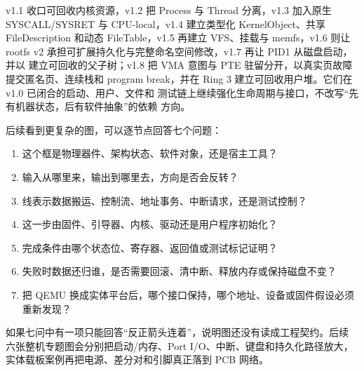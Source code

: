 %
v1.1 收口可回收内核资源，v1.2 把 Process 与 Thread 分离，v1.3 加入原生
SYSCALL/SYSRET 与 CPU-local，v1.4 建立类型化 KernelObject、共享
FileDescription 和动态 FileTable，v1.5 再建立 VFS、挂载与 memfs，v1.6
则让 rootfs v2 承担可扩展持久化与完整命名空间修改，v1.7 再让 PID1
从磁盘启动，并以  建立可回收的父子树；v1.8
把 VMA 意图与 PTE 驻留分开，以真实页故障提交匿名页、连续栈和 program
break，并在 Ring 3 建立可回收用户堆。它们在
v1.0 已闭合的启动、用户、文件和
测试链上继续强化生命周期与接口，不改写“先有机器状态，后有软件抽象”的依赖
方向。

后续看到更复杂的图，可以逐节点回答七个问题：

\begin{enumerate}[leftmargin=2.2em]
  \item 这个框是物理器件、架构状态、软件对象，还是宿主工具？
  \item 输入从哪里来，输出到哪里去，方向是否会反转？
  \item 线表示数据搬运、控制流、地址事务、中断请求，还是测试控制？
  \item 这一步由固件、引导器、内核、驱动还是用户程序初始化？
  \item 完成条件由哪个状态位、寄存器、返回值或测试标记证明？
  \item 失败时数据还归谁，是否需要回滚、清中断、释放内存或保持磁盘不变？
  \item 把 QEMU 换成实体平台后，哪个接口保持，哪个地址、设备或固件假设必须
        重新发现？
\end{enumerate}

如果七问中有一项只能回答“反正箭头连着”，说明图还没有读成工程契约。后续
六张整机专题图会分别把启动/内存、Port I/O、中断、键盘和持久化路径放大，
实体载板案例再把电源、差分对和引脚真正落到 PCB 网络。
